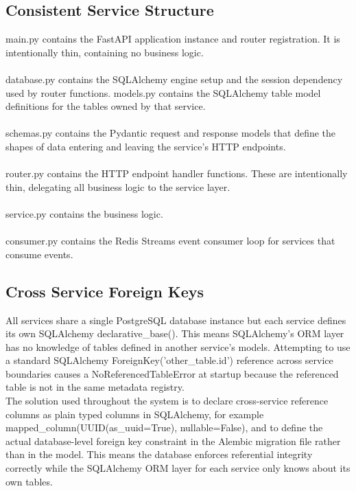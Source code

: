 \documentclass{article}
\begin{document}
\subsection{Consistent Service Structure}
main.py contains the FastAPI application instance and router registration. It is intentionally thin, containing no business logic.\\\\
database.py contains the SQLAlchemy engine setup and the session dependency used by router functions.
models.py contains the SQLAlchemy table model definitions for the tables owned by that service.\\\\
schemas.py contains the Pydantic request and response models that define the shapes of data entering and leaving the service's HTTP endpoints.\\\\
router.py contains the HTTP endpoint handler functions. These are intentionally thin, delegating all business logic to the service layer.\\\\
service.py contains the business logic.\\\\
consumer.py contains the Redis Streams event consumer loop for services that consume events.

\subsection{Cross Service Foreign Keys}
All services share a single PostgreSQL database instance but each service defines its own SQLAlchemy declarative_base(). This means SQLAlchemy's ORM layer has no knowledge of tables defined in another service's models. Attempting to use a standard SQLAlchemy ForeignKey('other_table.id') reference across service boundaries causes a NoReferencedTableError at startup because the referenced table is not in the same metadata registry.\\
The solution used throughout the system is to declare cross-service reference columns as plain typed columns in SQLAlchemy, for example mapped_column(UUID(as_uuid=True), nullable=False), and to define the actual database-level foreign key constraint in the Alembic migration file rather than in the model. This means the database enforces referential integrity correctly while the SQLAlchemy ORM layer for each service only knows about its own tables.
\end{document}
